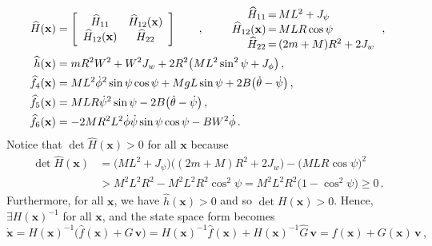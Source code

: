 \documentclass[a4paper]{article}
\renewcommand{\vec}[1]{\mathbf{#1}} %
\newcommand{\vx}{\vec{x}}
\newcommand{\vv}{\vec{v}}
\newcommand{\hH}{\widehat{H}}
\newcommand{\hh}{\widehat{h}}
\newcommand{\hf}{\widehat{f}}
\newcommand{\hG}{\widehat{G}}
\newcommand{\pitch}{\psi}
\newcommand{\yaw}{\phi}
\newcommand{\roll}{\theta}
\begin{document}
\begin{equation} \begin{split}
    \widehat{H}(\vx) &= \left[ \begin{array}{cc}
                        \hH_{11} & \hH_{12}(\vx) \\
                        \hH_{12}(\vx) & \hH_{22} \\
                        \end{array} \right]
    \qquad , \qquad
    \begin{array}{r@{\,=\,}l}
        \hH_{11} & M L^2 + J_\pitch \\
        \hH_{12}(\vx) & M L R \cos\pitch \\
        \hH_{22} & (2 m + M) R^2 + 2 J_w \\
    \end{array}
    \,, \\
    \hh(\vx) &= m R^2 W^2 + W^2 J_w
              + 2 R^2 \big( M L^2 \sin^2\pitch + J_\yaw \big)
    \,, \\
    \hf_4(\vx) &= M L^2 \dot\yaw^2 \sin\pitch \cos\pitch
                + M g L \sin\pitch
                + 2 B \big( \dot\roll - \dot\pitch \big)
    \,, \\
    \hf_5(\vx) &= M L R \dot\pitch^2 \sin\pitch
                - 2 B \big( \dot\roll - \dot\pitch \big)
    \,, \\
    \hf_6(\vx) &= -2 M R^2 L^2 \dot\yaw \dot\pitch \sin\pitch \cos\pitch
                - B W^2 \dot\yaw
    \,.
\end{split} \end{equation}
Notice that $\det\hH(\vx) > 0$ for all $\vx$ because
\begin{equation} \begin{split}
    \det\hH(\vx) &= \big( M L^2 + J_\psi \big)
                    \Big( (2m + M) R^2 + 2 J_w \Big)
                  - \big( M L R \cos\pitch \big)^2
                 \\
                 &> M^2 L^2 R^2
                  - M^2 L^2 R^2 \cos^2\pitch
                  = M^2 L^2 R^2 \big( 1 - \cos^2\pitch \big)
                  \ge 0
                  \,.
\end{split} \end{equation}
Furthermore, for all $\vx$, we have $\hh(\vx) > 0$ and so $\det H(\vx) > 0$.
Hence, $\exists H(\vx)^{-1}$ for all $\vx$, and the state space form becomes
\begin{equation}
    \dot{\vx} = H(\vx)^{-1} \Big(\hf(\vx) + \hG \, \vv\Big)
              = H(\vx)^{-1} \hf(\vx) + H(\vx)^{-1} \hG \, \vv
              = f(\vx) + G(\vx) \, \vv
              \,,
\end{equation}
\end{document}
